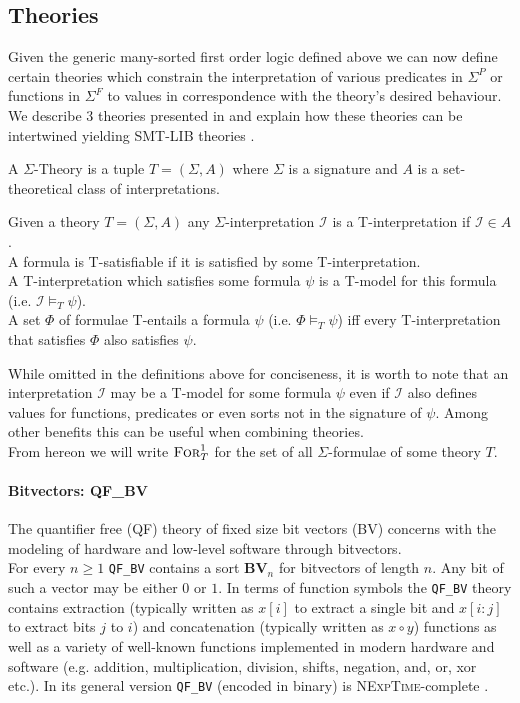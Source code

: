 \subsection{Theories}
Given the generic many-sorted first order logic defined above we can now define certain theories which constrain the interpretation of various predicates in $\Sigma^P$ or functions in $\Sigma^F$ to values in correspondence with the theory's desired behaviour. We describe 3 theories presented in \cite{Barrett-Tinelli-SMT} and explain how these theories can be intertwined yielding SMT-LIB theories \cite{BarFT-SMTLIB}.

\begin{definition}
A $\Sigma$-Theory is a tuple $T=\left(\Sigma,A\right)$ where $\Sigma$ is a signature and $A$ is a set-theoretical class of interpretations.
\end{definition}

\begin{definition}
Given a theory $T=\left(\Sigma,A\right)$ any $\Sigma$-interpretation $\mathcal{I}$ is a T-interpretation if $\mathcal{I}\in A$.\\
A formula is T-satisfiable if it is satisfied by some T-interpretation.\\
A T-interpretation which satisfies some formula $\psi$ is a T-model for this formula (i.e. $\mathcal{I}\vDash_T\psi$).\\
A set $\Phi$ of formulae T-entails a formula $\psi$ (i.e. $\Phi\vDash_T\psi$) iff every T-interpretation that satisfies $\Phi$ also satisfies $\psi$.
\end{definition}
While omitted in the definitions above for conciseness, it is worth to note that an interpretation $\mathcal{I}$ may be a T-model for some formula $\psi$ even if $\mathcal{I}$ also defines values for functions, predicates or even sorts not in the signature of $\psi$. Among other benefits this can be useful when combining theories.\\
From hereon we will write $\textsc{For}^1_T$ for the set of all $\Sigma$-formulae of some theory $T$.

\paragraph{Bitvectors: QF\_BV}
The quantifier free (QF) theory of fixed size bit vectors (BV) concerns with the modeling of hardware and low-level software through bitvectors.\\
For every $n\geq1$ \texttt{QF\_BV} contains a sort $\mathbf{BV}_n$ for bitvectors of length $n$. Any bit of such a vector may be either $0$ or $1$.
In terms of function symbols the \texttt{QF\_BV} theory contains extraction (typically written as $x[i]$ to extract a single bit and $x[i\colon j]$ to extract bits $j$ to $i$) and concatenation (typically written as $x\circ y$) functions as well as a variety of well-known functions implemented in modern hardware and software (e.g. addition, multiplication, division, shifts, negation, and, or, xor etc.). In its general version \texttt{QF\_BV} (encoded in binary) is \textsc{NExpTime}-complete \cite{KovasznaiFroehlichBiere-SMT12}.

